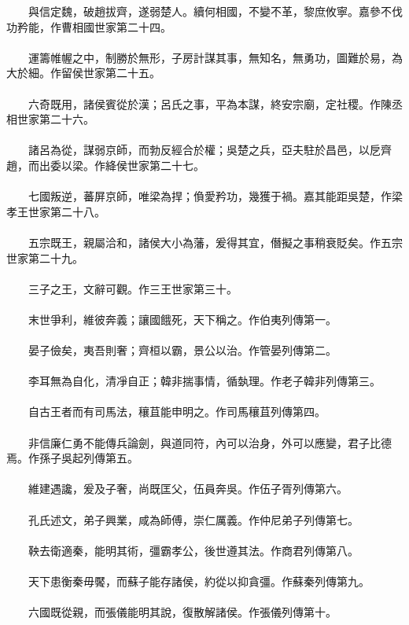 　　與信定魏，破趙拔齊，遂弱楚人。續何相國，不變不革，黎庶攸寧。嘉參不伐功矜能，作曹相國世家第二十四。
\\\\
　　運籌帷幄之中，制勝於無形，子房計謀其事，無知名，無勇功，圖難於易，為大於細。作留侯世家第二十五。
\\\\
　　六奇既用，諸侯賓從於漢；呂氏之事，平為本謀，終安宗廟，定社稷。作陳丞相世家第二十六。
\\\\
　　諸呂為從，謀弱京師，而勃反經合於權；吳楚之兵，亞夫駐於昌邑，以戹齊趙，而出委以梁。作絳侯世家第二十七。
\\\\
　　七國叛逆，蕃屏京師，唯梁為捍；偩愛矜功，幾獲于禍。嘉其能距吳楚，作梁孝王世家第二十八。
\\\\
　　五宗既王，親屬洽和，諸侯大小為藩，爰得其宜，僭擬之事稍衰貶矣。作五宗世家第二十九。
\\\\
　　三子之王，文辭可觀。作三王世家第三十。
\\\\
　　末世爭利，維彼奔義；讓國餓死，天下稱之。作伯夷列傳第一。
\\\\
　　晏子儉矣，夷吾則奢；齊桓以霸，景公以治。作管晏列傳第二。
\\\\
　　李耳無為自化，清凈自正；韓非揣事情，循埶理。作老子韓非列傳第三。
\\\\
　　自古王者而有司馬法，穰苴能申明之。作司馬穰苴列傳第四。
\\\\
　　非信廉仁勇不能傳兵論劍，與道同符，內可以治身，外可以應變，君子比德焉。作孫子吳起列傳第五。
\\\\
　　維建遇讒，爰及子奢，尚既匡父，伍員奔吳。作伍子胥列傳第六。
\\\\
　　孔氏述文，弟子興業，咸為師傅，崇仁厲義。作仲尼弟子列傳第七。
\\\\
　　鞅去衛適秦，能明其術，彊霸孝公，後世遵其法。作商君列傳第八。
\\\\
　　天下患衡秦毋饜，而蘇子能存諸侯，約從以抑貪彊。作蘇秦列傳第九。
\\\\
　　六國既從親，而張儀能明其說，復散解諸侯。作張儀列傳第十。
